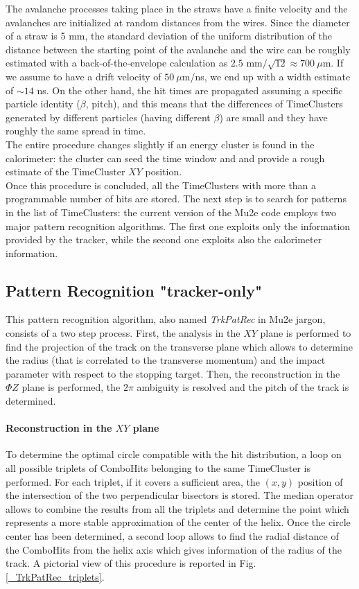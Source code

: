 \documentclass[12pt,a4paper,openright, oneside, titlepage]{book} %
\begin{document}
\noindent The avalanche processes taking place in the straws have a finite velocity and the avalanches are initialized at random distances from the wires. 
Since the diameter of a straw is 5 mm, the standard deviation of the uniform distribution of the distance between the starting point of the avalanche and the wire can be roughly estimated with a back-of-the-envelope calculation as $2.5$ mm$/\sqrt{12}\approx 700\ \mu$m. 
If we assume to have a drift velocity of $50\ \mu$m/ns, we end up with a width estimate of $\sim 14$ ns. 
On the other hand, the hit times are propagated assuming a specific particle identity ($\beta$, pitch), and this means that the differences of TimeClusters generated by different particles (having different $\beta$) are small and they have roughly the same spread in time.\\
The entire procedure changes slightly if an energy cluster is found in the calorimeter: the cluster can seed the time window and and provide a rough estimate of the TimeCluster $XY$ position.\\

\noindent Once this procedure is concluded, all the TimeClusters with more than a programmable number of hits are stored. 
The next step is to search for patterns in the list of TimeClusters:  the current version of the Mu2e code employs two major pattern recognition algorithms. 
The first one exploits only the information provided by the tracker, while the second one exploits also the calorimeter information.

\subsection{Pattern Recognition "tracker-only"}
This pattern recognition algorithm, also named \textit{TrkPatRec} in Mu2e jargon, consists of a two step process. 
First, the analysis in the $XY$ plane is performed to find the projection of the track on the transverse plane which allows to determine the radius (that is correlated to the transverse momentum) and the impact parameter with respect to the stopping target. 
Then, the reconstruction in the $\Phi Z$ plane is performed, the $2\pi$ ambiguity is resolved and the pitch of the track is determined.

\paragraph{Reconstruction in the $XY$ plane} To determine the optimal circle compatible with the hit distribution, 
a loop on all possible triplets of ComboHits belonging to the same TimeCluster is performed. 
For each triplet, if it covers a sufficient area, the $(x,y)$ position of the intersection 
of the two perpendicular bisectors is stored. 
The median operator allows to combine the results from all the triplets and determine 
the point which represents a more stable approximation of the center of the helix. 
Once the circle center has been determined, 
a second loop allows to find the radial distance of the ComboHits from the helix axis 
which gives information of the radius of the track. 
A pictorial view of this procedure is reported in Fig. \ref{_TrkPatRec_triplets}.
\end{document}

